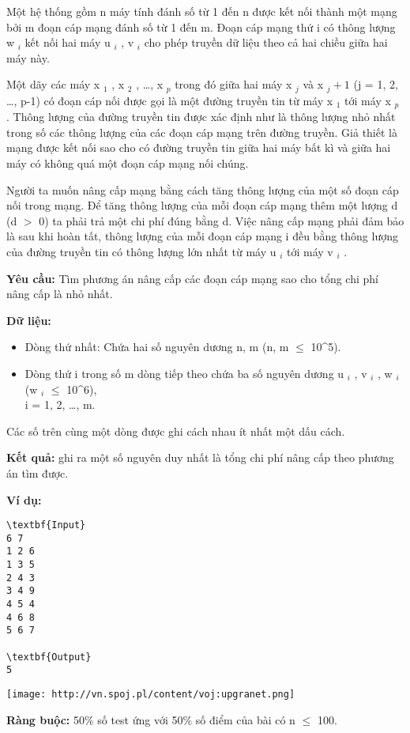 

Một hệ thống gồm n máy tính đánh số từ 1 đến n được kết nối thành một mạng bởi m đoạn cáp mạng đánh số từ 1 đến m. Đoạn cáp mạng thứ i có thông lượng w $_ i $ kết nối hai máy u $_ i $ , v $_ i $ cho phép truyền dữ liệu theo cả hai chiều giữa hai máy này.

Một dãy các máy x $_ 1 $ , x $_ 2 $ , …, x $_ p $ trong đó giữa hai máy x $_ j $ và x $_ j+1 $ (j = 1, 2, …, p-1) có đoạn cáp nối được gọi là một đường truyền tin từ máy x $_ 1 $ tới máy x $_ p $ . Thông lượng của đường truyền tin được xác định như là thông lượng nhỏ nhất trong số các thông lượng của các đoạn cáp mạng trên đường truyền. Giả thiết là mạng được kết nối sao cho có đường truyền tin giữa hai máy bất kì và giữa hai máy có không quá một đoạn cáp mạng nối chúng.

Người ta muốn nâng cấp mạng bằng cách tăng thông lượng của một số đoạn cáp nối trong mạng. Để tăng thông lượng của mỗi đoạn cáp mạng thêm một lượng d (d $>$ 0) ta phải trả một chi phí đúng bằng d. Việc nâng cấp mạng phải đảm bảo là sau khi hoàn tất, thông lượng của mỗi đoạn cáp mạng i đều bằng thông lượng của đường truyền tin có thông lượng lớn nhất từ máy u $_ i $ tới máy v $_ i $ .

\textbf{Yêu cầu: } Tìm phương án nâng cấp các đoạn cáp mạng sao cho tổng chi phí nâng cấp là nhỏ nhất.

\textbf{Dữ liệu: }
\begin{itemize}
	\item Dòng thứ nhất: Chứa hai số nguyên dương n, m (n, m  $\le$  10^5).
\end{itemize}
\begin{itemize}
	\item Dòng thứ i trong số m dòng tiếp theo chứa ba số nguyên dương u $_ i $ , v $_ i $ , w $_ i $ (w $_ i $  $\le$  10^6),
\\i = 1, 2, …, m.
\end{itemize}

Các số trên cùng một dòng được ghi cách nhau ít nhất một dấu cách.

\textbf{Kết quả: } ghi ra một số nguyên duy nhất là tổng chi phí nâng cấp theo phương án tìm được.

\textbf{Ví dụ: }\textbf{}
\begin{verbatim}
\textbf{Input}
6 7
1 2 6
1 3 5
2 4 3
3 4 9
4 5 4
4 6 8
5 6 7

\textbf{Output}
5\end{verbatim}


\texttt{[image: http://vn.spoj.pl/content/voj:upgranet.png]}

\textbf{Ràng buộc: } 50\% số test ứng với 50\% số điểm của bài có n  $\le$  100.
